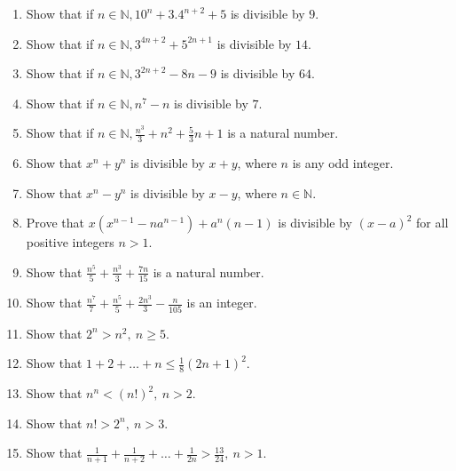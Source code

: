 \begin{enumerate}
\item Show that if $n\in\mathbb{N}, 10^n + 3.4^{n + 2} + 5$ is divisible by $9$.
\item Show that if $n\in\mathbb{N}, 3^{4n + 2} + 5^{2n + 1}$ is divisible by $14$.
\item Show that if $n\in\mathbb{N}, 3^{2n + 2} - 8n - 9$ is divisible by $64$.
\item Show that if $n\in\mathbb{N}, n^7 - n$ is divisible by $7$.
\item Show that if $n\in\mathbb{N}, \frac{n^3}{3} + n^2 + \frac{5}{3}n + 1$ is a natural number.
\item Show that $x^n + y^n$ is divisible by $x + y$, where $n$ is any odd integer.
\item Show that $x^n - y^n$ is divisible by $x - y$, where $n\in\mathbb{N}$.
\item Prove that $x(x^{n - 1} - na^{n - 1}) + a^n(n - 1)$ is divisible by $(x - a)^2$ for all positive integers $n > 1$.
\item Show that $\frac{n^5}{5} + \frac{n^3}{3} + \frac{7n}{15}$ is a natural number.
\item Show that $\frac{n^7}{7} + \frac{n^5}{5} + \frac{2n^3}{3} - \frac{n}{105}$ is an integer.
\item Show that $2^n > n^2,~n\geq 5$.
\item Show that $1 + 2 + \ldots + n\leq \frac{1}{8}(2n + 1)^2$.
\item Show that $n^n < (n!)^2,~n>2$.
\item Show that $n! > 2^n,~n>3$.
\item Show that $\frac{1}{n + 1} + \frac{1}{n + 2} + \ldots + \frac{1}{2n} > \frac{13}{24},~n>1$.
\end{enumerate}
